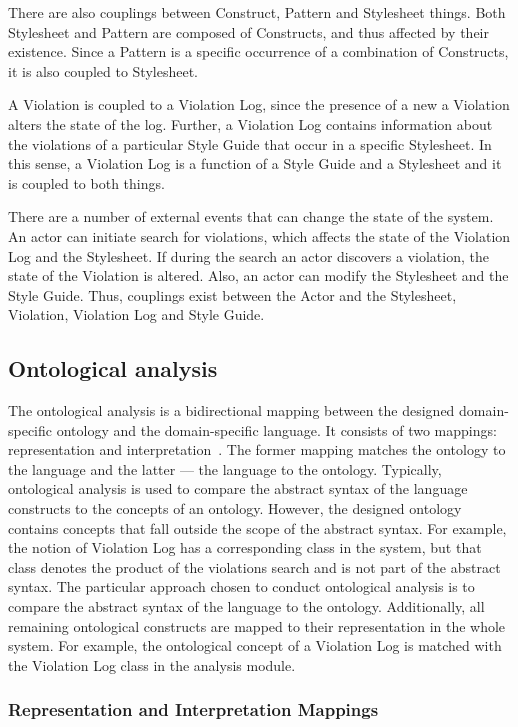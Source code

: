 There are also couplings between Construct, Pattern and Stylesheet things. Both Stylesheet and
Pattern are composed of Constructs, and thus affected by their existence. Since a Pattern is a
specific occurrence of a combination of Constructs, it is also coupled to Stylesheet.

A Violation is coupled to a Violation Log, since the presence of a new a Violation alters the state
of the log. Further, a Violation Log contains information about the violations of a particular Style
Guide that occur in a specific Stylesheet. In this sense, a Violation Log is a function of a Style
Guide and a Stylesheet and it is coupled to both things.

There are a number of external events that can change the state of the system. An actor can initiate
search for violations, which affects the state of the Violation Log and the Stylesheet. If during
the search an actor discovers a violation, the state of the Violation is altered. Also, an actor can
modify the Stylesheet and the Style Guide. Thus, couplings exist between the Actor and the
Stylesheet, Violation, Violation Log and Style Guide.

\subsection{Ontological analysis}

The ontological analysis is a bidirectional mapping between the designed domain-specific ontology
and the domain-specific language. It consists of two mappings: representation and
interpretation~\cite{moody2009physics}. The former mapping matches the ontology to the language and
the latter --- the language to the ontology. Typically, ontological analysis is used to compare the
abstract syntax of the language constructs to the concepts of an ontology. However, the designed
ontology contains concepts that fall outside the scope of the abstract syntax. For example, the
notion of Violation Log has a corresponding class in the system, but that class denotes the
product of the violations search and is not part of the abstract syntax. The particular approach
chosen to conduct ontological analysis is to compare the abstract syntax of the language to the
ontology. Additionally, all remaining ontological constructs are mapped to their representation in
the whole system. For example, the ontological concept of a Violation Log is matched with the
Violation Log class in the analysis module.

\subsubsection{Representation and Interpretation Mappings} 

